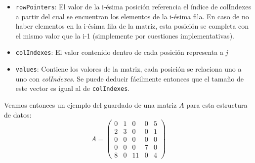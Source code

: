 	\begin{itemize}
		\item \texttt{rowPointers}: El valor de la i-ésima posición referencia el índice de colIndexes a partir del cual se encuentran los elementos de la i-ésima fila. En caso de no haber elementos en la i-ésima fila de la matriz, esta posición se completa con el mismo valor que la i-1 (simplemente por cuestiones implementativas). 
		\item \texttt{colIndexes}: El valor contenido dentro de cada posición representa a \textit{j}
		\item \texttt{values}: Contiene los valores de la matriz, cada posición se relaciona uno a uno con \textit{colIndexes}. Se puede deducir fácilmente entonces que el tamaño de este vector es igual al de \texttt{colIndexes}.
	\end{itemize}
	
	Veamos entonces un ejemplo del guardado de una matriz $A$ para esta estructura de datos:
\[	A =
	 \begin{pmatrix}
	 0 & 1 & 0 & 0 & 5 \\
	 2 & 3 & 0 & 0 & 1 \\
	 0 & 0 & 0 & 0 & 0 \\
	 0 & 0 & 0 & 7 & 0 \\
	 8 & 0 & 11 & 0 & 4
	 \end{pmatrix}
\]	

